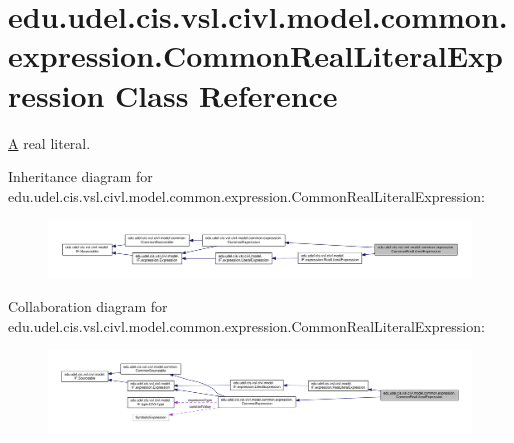 \hypertarget{classedu_1_1udel_1_1cis_1_1vsl_1_1civl_1_1model_1_1common_1_1expression_1_1CommonRealLiteralExpression}{}\section{edu.\+udel.\+cis.\+vsl.\+civl.\+model.\+common.\+expression.\+Common\+Real\+Literal\+Expression Class Reference}
\label{classedu_1_1udel_1_1cis_1_1vsl_1_1civl_1_1model_1_1common_1_1expression_1_1CommonRealLiteralExpression}


\hyperlink{structA}{A} real literal.  




Inheritance diagram for edu.\+udel.\+cis.\+vsl.\+civl.\+model.\+common.\+expression.\+Common\+Real\+Literal\+Expression\+:
\nopagebreak
\begin{figure}[H]
\begin{center}
\leavevmode
\includegraphics[width=350pt]{classedu_1_1udel_1_1cis_1_1vsl_1_1civl_1_1model_1_1common_1_1expression_1_1CommonRealLiteralExpression__inherit__graph}
\end{center}
\end{figure}


Collaboration diagram for edu.\+udel.\+cis.\+vsl.\+civl.\+model.\+common.\+expression.\+Common\+Real\+Literal\+Expression\+:
\nopagebreak
\begin{figure}[H]
\begin{center}
\leavevmode
\includegraphics[width=350pt]{classedu_1_1udel_1_1cis_1_1vsl_1_1civl_1_1model_1_1common_1_1expression_1_1CommonRealLiteralExpression__coll__graph}
\end{center}
\end{figure}
